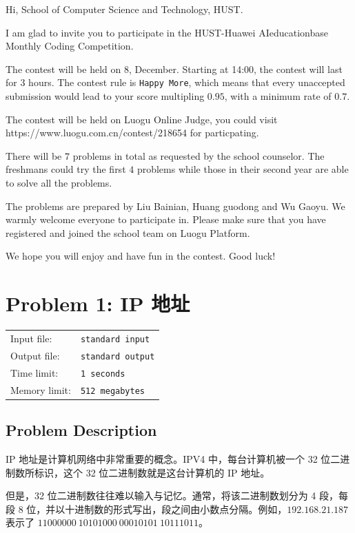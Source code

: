 \documentclass[12]{article}%
\begin{document}
	Hi, School of Computer Science and Technology, HUST.
	
	I am glad to invite you to participate in the HUST-Huawei AIeducationbase Monthly Coding Competition.
	
	The contest will be held on 8, December. Starting at 14:00, the contest will last for 3 hours. The contest rule is \texttt{Happy More}, which means that every unaccepted submission would lead to your score multipling $0.95$, with a minimum rate of $0.7$.
	
	The contest will be held on Luogu Online Judge, you could visit https://www.luogu.com.cn/contest/218654 for particpating.
	
	There will be $7$ problems in total as requested by the school counselor. The freshmans could try the first $4$ problems while those in their second year are able to solve all the problems.
	
	The problems are prepared by Liu Bainian, Huang guodong and Wu Gaoyu. We warmly welcome everyone to participate in. Please make sure that you have registered and joined the school team on Luogu Platform.
	
	We hope you will enjoy and have fun in the contest. Good luck!
	
	\newpage
	
	
	\section*{\textsf{Problem 1: }\textrm{IP 地址}}
	\begin{tabular}{ll}
		\fontsize{10pt}{10pt} Input file: & \fontsize{10pt}{10pt}\texttt{standard input} \\
		\fontsize{10pt}{10pt} Output file: & \fontsize{10pt}{10pt}\texttt{standard output}\\
		\fontsize{10pt}{10pt} Time limit: & \fontsize{10pt}{10pt}\texttt{1 seconds} \\
		\fontsize{10pt}{10pt} Memory limit: & \fontsize{10pt}{10pt}\texttt{512 megabytes}\\
	\end{tabular}
	\subsection*{\textsf{Problem Description}}
	
	IP 地址是计算机网络中非常重要的概念。IPV4 中，每台计算机被一个 32 位二进制数所标识，这个 32 位二进制数就是这台计算机的 IP 地址。
	
	但是，32 位二进制数往往难以输入与记忆。通常，将该二进制数划分为 4 段，每段 8 位，并以十进制数的形式写出，段之间由小数点分隔。例如，$192.168.21.187$ 表示了 $11000000\ 10101000\ 00010101\ 10111011$。
	
\end{document}
